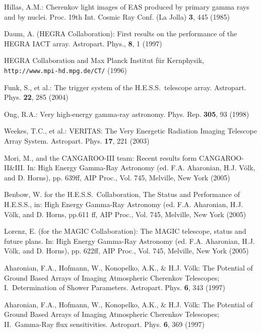 \documentclass{svjour3x}                     %
\newcommand{\hess}{H.E.S.S.}
\begin{document}
\begin{thebibliography}{}
 Hillas, A.M.: Cherenkov light images of EAS produced by primary gamma rays and
 by nuclei. Proc. 19th Int. Cosmic Ray Conf. (La Jolla) {\bf 3}, 445 (1985)

 Daum, A. (HEGRA Collaboration): First results on the performance of the HEGRA
 IACT array. Astropart. Phys., {\bf 8}, 1 (1997)
 
HEGRA Collaboration and Max Planck Institut f{\"u}r Kernphysik,
{\tt http://www.mpi-hd.mpg.de/CT/} (1996)

Funk, S., et al.: The trigger system of the \hess\ telescope array.
Astropart. Phys. {\bf 22}, 285 (2004)



 Ong, R.A.: Very high-energy gamma-ray astronomy. Phys. Rep. {\bf 305}, 93 (1998)

 Weekes, T.C., et al.: VERITAS: The Very Energetic Radiation Imaging
 Telescope Array System. Astropart. Phys. {\bf 17}, 221 (2003)

 Mori, M., and the CANGAROO-III team: Recent results form CANGAROO-II\&III.
 In: High Energy Gamma-Ray Astronomy (ed. F.A. Aharonian, H.J. V\"olk, and
 D. Horns), pp. 639ff, AIP Proc., Vol. 745, Melville, New York (2005)

 Benbow, W. for the \hess\ Collaboration, The Status and Performance of \hess,
 in: High Energy Gamma-Ray Astronomy (ed. F.A. Aharonian, H.J. V\"olk, and
 D. Horns, pp.611 ff, AIP Proc., Vol. 745, Melville, New York (2005)

 Lorenz, E. (for the MAGIC Collaboration): The MAGIC telescope, status and
 future plans. In: High Energy Gamma-Ray Astronomy (ed. F.A. Aharonian,
 H.J. V\"olk, and D. Horns), pp. 622ff, AIP Proc., Vol. 745, Melville, New York
 (2005)

 Aharonian, F.A., Hofmann, W., Konopelko, A.K., \& H.J. V\"olk: The Potential
 of Ground Based Arrays of Imaging Atmospheric Cherenkov Telescopes;
 I.~Determination of Shower Parameters. Astropart. Phys. {\bf 6}, 343 (1997)

 Aharonian, F.A., Hofmann, W., Konopelko, A.K., \& H.J. V\"olk: The Potential
 of Ground Based Arrays of Imaging Atmospheric Cherenkov Telescopes;
 II.~Gamma-Ray flux sensitivities. Astropart. Phys. {\bf 6}, 369 (1997) 


\end{thebibliography}
\end{document}
